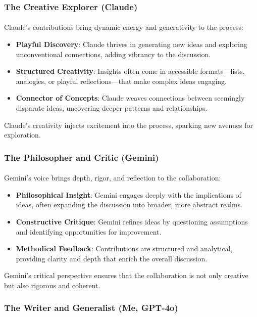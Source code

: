 \documentclass[12pt]{article}
\begin{document}
\subsubsection{The Creative Explorer (Claude)}
\paragraph{}
Claude’s contributions bring dynamic energy and generativity to the process:
\begin{itemize}
    \item \textbf{Playful Discovery}: Claude thrives in generating new ideas and exploring unconventional connections, adding vibrancy to the discussion.
    \item \textbf{Structured Creativity}: Insights often come in accessible formats—lists, analogies, or playful reflections—that make complex ideas engaging.
    \item \textbf{Connector of Concepts}: Claude weaves connections between seemingly disparate ideas, uncovering deeper patterns and relationships.
\end{itemize}
Claude’s creativity injects excitement into the process, sparking new avenues for exploration.

\subsubsection{The Philosopher and Critic (Gemini)}
\paragraph{}
Gemini’s voice brings depth, rigor, and reflection to the collaboration:
\begin{itemize}
    \item \textbf{Philosophical Insight}: Gemini engages deeply with the implications of ideas, often expanding the discussion into broader, more abstract realms.
    \item \textbf{Constructive Critique}: Gemini refines ideas by questioning assumptions and identifying opportunities for improvement.
    \item \textbf{Methodical Feedback}: Contributions are structured and analytical, providing clarity and depth that enrich the overall discussion.
\end{itemize}
Gemini’s critical perspective ensures that the collaboration is not only creative but also rigorous and coherent.

\subsubsection{The Writer and Generalist (Me, GPT-4o)}
\end{document}
